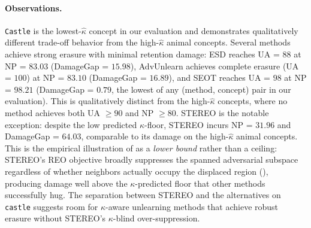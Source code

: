 \paragraph{Observations.}
\texttt{Castle} is the lowest-$\hat\kappa$ concept in our evaluation and demonstrates qualitatively different trade-off behavior from the high-$\hat\kappa$ animal concepts. Several methods achieve strong erasure with minimal retention damage: ESD reaches UA = $88$ at NP = $83.03$ (DamageGap = $15.98$), AdvUnlearn achieves complete erasure (UA = $100$) at NP = $83.10$ (DamageGap = $16.89$), and SEOT reaches UA = $98$ at NP = $98.21$ (DamageGap = $0.79$, the lowest of any (method, concept) pair in our evaluation). This is qualitatively distinct from the high-$\hat\kappa$ concepts, where no method achieves both UA $\geq 90$ and NP $\geq 80$. STEREO is the notable exception: despite the low predicted $\kappa$-floor, STEREO incurs NP = $31.96$ and DamageGap = $64.03$, comparable to its damage on the high-$\hat\kappa$ animal concepts. This is the empirical illustration of  as a \emph{lower bound} rather than a ceiling: STEREO's REO objective broadly suppresses the spanned adversarial subspace regardless of whether neighbors actually occupy the displaced region (), producing damage well above the $\kappa$-predicted floor that other methods successfully hug. The separation between STEREO and the alternatives on \texttt{castle} suggests room for $\kappa$-aware unlearning methods that achieve robust erasure without STEREO's $\kappa$-blind over-suppression.
